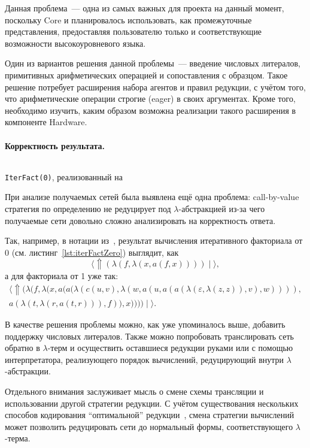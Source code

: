 Данная проблема~--- одна из самых важных для проекта на данный момент, поскольку Core и \INs{} планировалось использовать, как промежуточные представления, предоставляя пользователю только \LamagraphML{} и соответствующие возможности высокоуровневого языка.

Один из вариантов решения данной проблемы~--- введение числовых литералов, примитивных арифметических операцией и сопоставления с образцом.
Такое решение потребует расширения набора агентов и правил редукции, с учётом того, что арифметические операции строгие (eager) в своих аргументах.
Кроме того, необходимо изучить, каким образом возможна реализации такого расширения в компоненте Hardware.

\paragraph{Корректность результата.}
\begin{listing}
    \inputminted[fontsize=\footnotesize, breaklines]{ocaml}{figures/iterFactZero.lml}
    \caption{\texttt{IterFact(0)}, реализованный на \LamagraphML{}}
    \label{lst:iterFactZero}
\end{listing}
При анализе получаемых сетей была выявлена ещё одна проблема: call-by-value стратегия по определению не редуцирует под $\lambda$-абстракцией из-за чего получаемые сети довольно сложно анализировать на корректность ответа.

Так, например, в нотации из~\cite{fernandezCalculusInteractionNets1999}, результат вычисления итеративного факториала от 0 (см. листинг~\ref{lst:iterFactZero}) выглядит, как
\[\big\langle \Uparrow(\lambda(f, \lambda(x, a(f, x)))) \mid \big\rangle,\]
а для факториала от 1 уже так:
\begin{multline*}
    \big\langle \Uparrow(\lambda(f, \lambda(x, a(a(\lambda(c(u, v), \lambda(w, a(u, a(a(\lambda(\varepsilon, \lambda(z, z)), v), w)))), \\
    a(\lambda(t, \lambda(r, a(t, r))), f)), x)))) \mid \big\rangle.
\end{multline*}

В качестве решения проблемы можно, как уже упоминалось выше, добавить поддержку числовых литералов.
Также можно попробовать транслировать сеть обратно в $\lambda$-терм и осуществить оставшиеся редукции руками или с помощью интерпретатора, реализующего порядок вычислений, редуцирующий внутри $\lambda$-абстракции.

Отдельного внимания заслуживает мысль о смене схемы трансляции и использовании другой стратегии редукции.
С учётом существования нескольких способов кодирования \enquote{оптимальной} редукции~\cite{lampingAlgorithmOptimalLambda1990, aspertiBolognaOptimalHigherorder1996, gonthierGeometryOptimalLambda1992, vincentvanoostromLambdascopeAnotherOptimal2004}, смена стратегии вычислений может позволить редуцировать сети до нормальный формы, соответствующего $\lambda$-терма.

